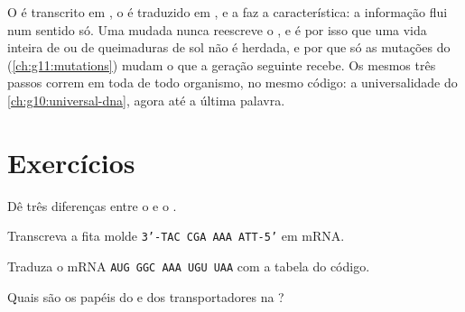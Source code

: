 \begin{remark}\label{rem:g11:gene-expression:flow}
O  é transcrito em , o  é traduzido em , e a 
faz a característica: a informação flui num sentido só. Uma 
mudada nunca reescreve o , e é por isso que uma vida inteira de
 ou de queimaduras de sol não é herdada, e por que só as
mutações do  (\cref{ch:g11:mutations}) mudam o que a geração
seguinte recebe. Os mesmos três passos correm em toda  de todo
organismo, no mesmo código: a universalidade do
\cref{ch:g10:universal-dna}, agora até a última palavra.
\end{remark}

\section{Exercícios}

\begin{exercise}[$\star$]\label{exo:g11:gene-expression:1}
Dê três diferenças entre o  e o .
\end{exercise}

\begin{exercise}[$\star$]\label{exo:g11:gene-expression:2}
Transcreva a fita molde \texttt{3'-TAC CGA AAA ATT-5'} em mRNA.
\end{exercise}

\begin{exercise}[$\star$]\label{exo:g11:gene-expression:3}
Traduza o mRNA \texttt{AUG GGC AAA UGU UAA} com a tabela do código.
\end{exercise}

\begin{exercise}[$\star$]\label{exo:g11:gene-expression:4}
Quais são os papéis do  e dos  transportadores na
?
\end{exercise}

